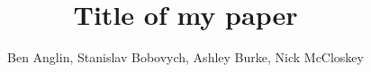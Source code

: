 \documentclass[a4paper,12pt]{article}
\begin{document}
\title{Title of my paper}
\author{Ben Anglin, Stanislav Bobovych, Ashley Burke, Nick McCloskey}
\maketitle

\graphicspath{{./images/}}

%
%

%
%
%
%
%
\cite{massasati:159}



\end{document}
